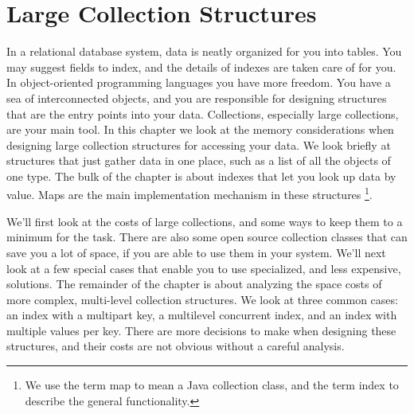 \chapter{Large Collection Structures}
\label{chapter:tables-indexes}

In a relational database system, data is neatly organized for you into tables.
You may suggest fields to index, and the details of indexes are
taken care of for you. In object-oriented programming languages
you have more freedom. You have a sea of interconnected objects, and you are responsible for designing structures that are the entry points into your
data. Collections, especially large collections, are your
main tool. In this chapter we look at the memory considerations when
designing large collection structures for accessing your
data. We look briefly
at structures that just gather data in one place, such as a list
of all the objects of one type. The bulk of the chapter is about indexes
that let you look up data by value. Maps are the main implementation
mechanism in these structures \footnote{We use the term map to mean a Java collection class,
and the term index to describe the general functionality.}. 

We'll first look at the costs of large collections, and some ways to keep them
to a minimum for the task. There are also some open source
collection classes that can save you a lot of space, if you are able to use them in your system. 
We'll next look at a few special cases that enable you to use
specialized, and less expensive, solutions. The remainder of the chapter is
about analyzing the space costs of more complex, multi-level collection
structures.  We look at three common cases: an index with a multipart key, a
multilevel concurrent index, and an index with multiple values per key. There are more decisions
to make when designing these structures, and their costs are
not obvious without a careful analysis. 





